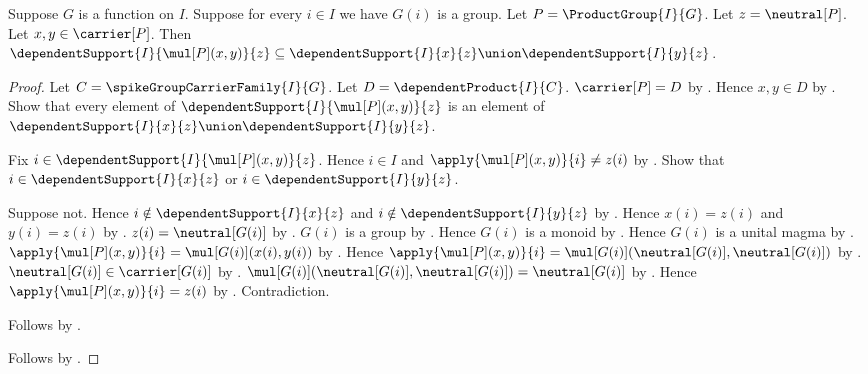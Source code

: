 \begin{proposition}\label{spike_product_group_mul_support}
    Suppose $G$ is a function on $I$.
    Suppose for every $i\in I$ we have $G(i)$ is a group.
    Let $P=\ProductGroup{I}{G}$.
    Let $z=\neutral[P]$.
    Let $x,y\in\carrier[P]$.
    Then
        $\dependentSupport{I}{\mul[P](x,y)}{z}
            \subseteq
        \dependentSupport{I}{x}{z}\union
            \dependentSupport{I}{y}{z}$.
\end{proposition}
\begin{proof}
    Let $C=\spikeGroupCarrierFamily{I}{G}$.
    Let $D=\dependentProduct{I}{C}$.
    $\carrier[P]=D$ by .
    Hence $x,y\in D$ by \auto.
    Show that every element of
        $\dependentSupport{I}{\mul[P](x,y)}{z}$ is an element of
        $\dependentSupport{I}{x}{z}\union
            \dependentSupport{I}{y}{z}$.
    \begin{subproof}
        Fix $i\in\dependentSupport{I}{\mul[P](x,y)}{z}$.
        Hence $i\in I$ and
            $\apply{\mul[P](x,y)}{i}\neq z(i)$ by
            .
        Show that $i\in\dependentSupport{I}{x}{z}$ or
            $i\in\dependentSupport{I}{y}{z}$.
        \begin{subproof}
            Suppose not.
            Hence $i\notin\dependentSupport{I}{x}{z}$ and
                $i\notin\dependentSupport{I}{y}{z}$ by \auto.
            Hence $x(i)=z(i)$ and $y(i)=z(i)$ by
                .
            $z(i)=\neutral[G(i)]$ by
                .
            $G(i)$ is a group by \auto.
            Hence $G(i)$ is a monoid by .
            Hence $G(i)$ is a unital magma by
                .
            $\apply{\mul[P](x,y)}{i}
                =\mul[G(i)](x(i),y(i))$ by
                .
            Hence $\apply{\mul[P](x,y)}{i}
                =\mul[G(i)](\neutral[G(i)],\neutral[G(i)])$ by
                \auto.
            $\neutral[G(i)]\in\carrier[G(i)]$ by
                .
            $\mul[G(i)](\neutral[G(i)],\neutral[G(i)])
                =\neutral[G(i)]$ by .
            Hence $\apply{\mul[P](x,y)}{i}=z(i)$ by \auto.
            Contradiction.
        \end{subproof}
        Follows by .
    \end{subproof}
    Follows by .
\end{proof}

